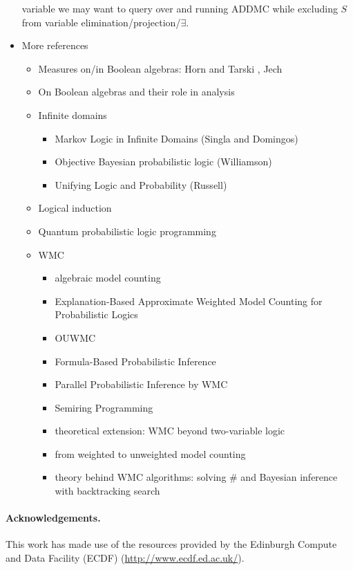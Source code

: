 \documentclass{article}
\theoremstyle{definition}
\theoremstyle{remark}
\begin{document}
\begin{itemize}
  variable we may want to query over and running ADDMC while excluding $S$ from
  variable elimination/projection/$\exists$.
\item More references
  \begin{itemize}
  \item Measures on/in Boolean algebras: Horn and Tarski
    \cite{horn1948measures}, Jech \cite{jech2017measures}
  \item On Boolean algebras and their role in analysis \cite{winkowska1996boolean}
  \item Infinite domains
    \begin{itemize}
    \item Markov Logic in Infinite Domains (Singla and Domingos)
      \cite{DBLP:conf/uai/SinglaD07}
    \item Objective Bayesian probabilistic logic (Williamson)
      \cite{DBLP:journals/jal/Williamson08}
    \item Unifying Logic and Probability (Russell)
      \cite{DBLP:journals/cacm/Russell15}
    \end{itemize}
  \item Logical induction \cite{DBLP:journals/eccc/GarrabrantBCST16}
  \item Quantum probabilistic logic programming \cite{balu2015quantum}
  \item WMC
    \begin{itemize}
    \item algebraic model counting \cite{DBLP:journals/japll/KimmigBR17}
    \item Explanation-Based Approximate Weighted Model Counting for
      Probabilistic Logics \cite{DBLP:conf/aaai/RenkensKBR14}
    \item OUWMC \cite{DBLP:conf/aaai/Belle17}
    \item Formula-Based Probabilistic Inference \cite{DBLP:conf/uai/GogateD10}
    \item Parallel Probabilistic Inference by WMC \cite{DBLP:conf/pgm/DalLL18}
    \item Semiring Programming \cite{DBLP:journals/corr/BelleR16}
    \item theoretical extension: WMC beyond two-variable logic
      \cite{DBLP:conf/lics/KuusistoL18}
    \item from weighted to unweighted model counting
      \cite{DBLP:conf/ijcai/ChakrabortyFMV15}
    \item theory behind WMC algorithms: solving \#\SAT{} and Bayesian inference
      with backtracking search \cite{DBLP:journals/jair/BacchusDP09}
    \end{itemize}
  \end{itemize}
\end{itemize}

\paragraph{Acknowledgements.} This work has made use of the resources provided
by the Edinburgh Compute and Data Facility (ECDF)
(\url{http://www.ecdf.ed.ac.uk/}).



\end{document}
